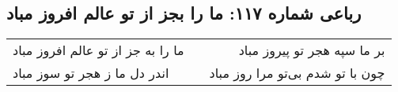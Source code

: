 \begin{center}
\section*{رباعی شماره ۱۱۷: ما را بجز از تو عالم افروز مباد}
\label{sec:sh117}
\begin{longtable}{l p{0.5cm} r}
ما را به جز از تو عالم افروز مباد
&&
بر ما سپه هجر تو پیروز مباد
\\
اندر دل ما ز هجر تو سوز مباد
&&
چون با تو شدم بی‌تو مرا روز مباد
\\
\end{longtable}
\end{center}
